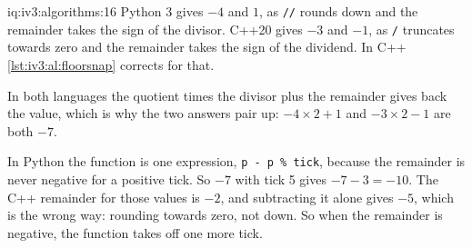 \begin{solution}{iq:iv3:algorithms:16}
Python 3 gives $-4$ and $1$, as \texttt{//} rounds down and the remainder takes the sign of the divisor. C++20 gives $-3$ and $-1$, as \texttt{/} truncates towards zero and the remainder takes the sign of the dividend. In C++ \cref{lst:iv3:al:floorsnap} corrects for that.
\label{lst:iv3:al:floorsnap}

In both languages the quotient times the divisor plus the remainder gives back the value, which is why the two answers pair up: $-4 \times 2 + 1$ and $-3 \times 2 - 1$ are both $-7$.

In Python the function is one expression, \texttt{p - p \% tick}, because the remainder is never negative for a positive tick. So $-7$ with tick 5 gives $-7 - 3 = -10$. The C++ remainder for those values is $-2$, and subtracting it alone gives $-5$, which is the wrong way: rounding towards zero, not down. So when the remainder is negative, the function takes off one more tick.

\end{solution}

